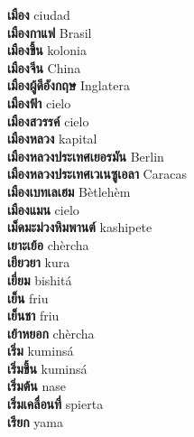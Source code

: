 \textbf{ เมือง  } ciudad \\
\textbf{ เมืองกาแฟ  } Brasil \\
\textbf{ เมืองขึ้น  } kolonia \\
\textbf{ เมืองจีน  } China \\
\textbf{ เมืองผู้ดีอังกฤษ  } Inglatera \\
\textbf{ เมืองฟ้า  } cielo \\
\textbf{ เมืองสวรรค์  } cielo \\
\textbf{ เมืองหลวง  } kapital \\
\textbf{ เมืองหลวงประเทศเยอรมัน  } Berlin \\
\textbf{ เมืองหลวงประเทศเวเนซูเอลา  } Caracas \\
\textbf{ เมืองเบทเลเฮม  } Bètlehèm \\
\textbf{ เมืองแมน  } cielo \\
\textbf{ เม็ดมะม่วงหิมพานต์  } kashipete \\
\textbf{ เยาะเย้อ  } chèrcha \\
\textbf{ เยียวยา  } kura \\
\textbf{ เยี่ยม  } bishitá \\
\textbf{ เย็น  } friu \\
\textbf{ เย็นชา  } friu \\
\textbf{ เย้าหยอก  } chèrcha \\
\textbf{ เริ่ม  } kuminsá \\
\textbf{ เริ่มขึ้น  } kuminsá \\
\textbf{ เริ่มต้น  } nase \\
\textbf{ เริ่มเคลื่อนที่  } spierta \\
\textbf{ เรียก  } yama \\
